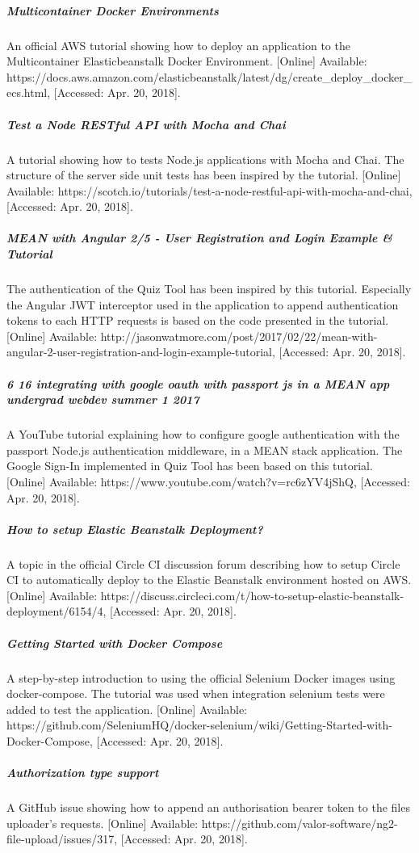 \subparagraph{Multicontainer Docker Environments}
An official AWS tutorial showing how to deploy an application to the Multicontainer Elasticbeanstalk Docker
Environment. [Online] Available: https://docs.aws.amazon.com/elasticbeanstalk/latest/dg/create\_deploy\_docker\_ecs.html, [Accessed: Apr. 20, 2018].

\subparagraph{Test a Node RESTful API with Mocha and Chai}
A tutorial showing how to tests Node.js applications with Mocha and Chai. The structure of the server side
unit tests has been inspired by the tutorial. [Online] Available: https://scotch.io/tutorials/test-a-node-restful-api-with-mocha-and-chai,
[Accessed: Apr. 20, 2018].

\subparagraph{MEAN with Angular 2/5 - User Registration and Login Example \& Tutorial}
The authentication of the Quiz Tool has been inspired by this tutorial. Especially the Angular
JWT interceptor used in the application to append authentication tokens to each HTTP requests is based on the
code presented in the tutorial. [Online] Available: http://jasonwatmore.com/post/2017/02/22/mean-with-angular-2-user-registration-and-login-example-tutorial,
[Accessed: Apr. 20, 2018].

\subparagraph{6 16 integrating with google oauth with passport js in a MEAN app undergrad webdev summer 1 2017}
A YouTube tutorial explaining how to configure google authentication with the passport Node.js
authentication middleware, in a MEAN stack application. The Google Sign-In implemented in Quiz Tool
has been based on this tutorial. [Online] Available: https://www.youtube.com/watch?v=rc6zYV4jShQ,
[Accessed: Apr. 20, 2018].

\subparagraph{How to setup Elastic Beanstalk Deployment?}
A topic in the official Circle CI discussion forum describing how to setup Circle CI to automatically
deploy to the Elastic Beanstalk environment hosted on AWS. [Online] Available: https://discuss.circleci.com/t/how-to-setup-elastic-beanstalk-deployment/6154/4,
[Accessed: Apr. 20, 2018].

\subparagraph{Getting Started with Docker Compose}
A step-by-step introduction to using the official Selenium Docker images using docker-compose. The tutorial
was used when integration selenium tests were added to test the application.
[Online] Available: https://github.com/SeleniumHQ/docker-selenium/wiki/Getting-Started-with-Docker-Compose,
[Accessed: Apr. 20, 2018].

\subparagraph{Authorization type support}
A GitHub issue showing how to append an authorisation bearer token to the files uploader's requests.
[Online] Available: https://github.com/valor-software/ng2-file-upload/issues/317,
[Accessed: Apr. 20, 2018].











%
